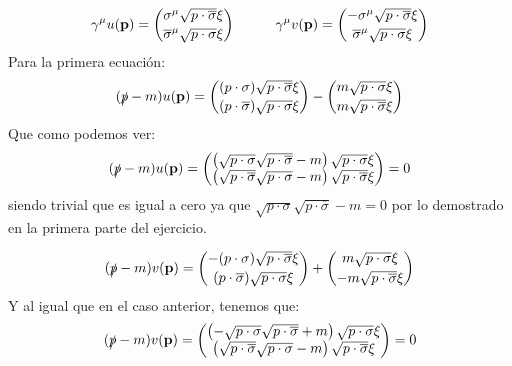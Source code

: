 \begin{solucion}
	\begin{equation*}
		\gamma^\mu u(\mathbf{p}) = \binom{\sigma^\mu \sqrt{p\cdot \overline{\sigma}} \xi}{\overline{\sigma}^\mu\sqrt{p\cdot \sigma} \xi } \quad \quad \quad 
		\gamma^\mu v(\mathbf{p}) = \binom{-\sigma^\mu \sqrt{p\cdot \overline{\sigma}} \xi}{\overline{\sigma}^\mu\sqrt{p\cdot \sigma} \xi }
	\end{equation*}
	Para la primera ecuación:
	\begin{equation*}
		( \slashed{p} - m ) u (\mathbf{p}) = \binom{(p\cdot \sigma) \sqrt{p \cdot \overline{\sigma}}\xi}{(p\cdot \overline{\sigma}) \sqrt{p \cdot \sigma}\xi} - \binom{m \sqrt{p\cdot \sigma} \xi}{m \sqrt{p\cdot \overline{\sigma} } \xi}
	\end{equation*}
	Que como podemos ver:
	\begin{equation*}
		( \slashed{p} - m ) u (\mathbf{p}) = \begin{pmatrix}
			\left( \sqrt{p\cdot \sigma }\sqrt{p \cdot \overline{\sigma}} - m  \right)  \sqrt{p\cdot \sigma } \xi \\ \left( \sqrt{p\cdot \overline{\sigma} } \sqrt{p \cdot \sigma} - m  \right)\sqrt{p\cdot \overline{\sigma} } \xi 
		\end{pmatrix}=0
	\end{equation*}
	siendo trivial que es igual a cero ya que $\sqrt{p\cdot \sigma }\sqrt{p \cdot \overline{\sigma}} - m=0$ por lo demostrado en la primera parte del ejercicio.
	
	\begin{equation*}
		( \slashed{p} - m ) v (\mathbf{p}) = \binom{-(p\cdot \sigma) \sqrt{p \cdot \overline{\sigma}}\xi}{(p\cdot \overline{\sigma}) \sqrt{p \cdot \sigma}\xi} + \binom{m \sqrt{p\cdot \sigma} \xi}{-m \sqrt{p\cdot \overline{\sigma} } \xi}
	\end{equation*}
	Y al igual que en el caso anterior, tenemos que:
	\begin{equation*}
		( \slashed{p} - m ) v (\mathbf{p}) = \begin{pmatrix}
			\left( -\sqrt{p\cdot \sigma }\sqrt{p \cdot \overline{\sigma}} + m  \right)  \sqrt{p\cdot \sigma } \xi \\ \left( \sqrt{p\cdot \overline{\sigma} } \sqrt{p \cdot \sigma} - m  \right)\sqrt{p\cdot \overline{\sigma} } \xi 
		\end{pmatrix}= 0
	\end{equation*}
	
 \end{solucion}


